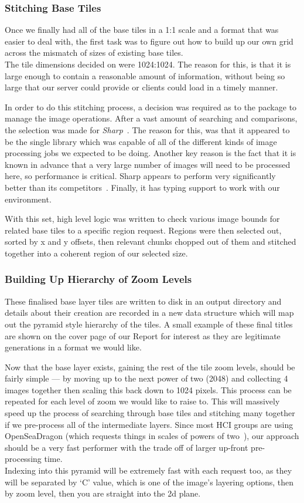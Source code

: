 \subsubsection{Stitching Base Tiles}
Once we finally had all of the base tiles in a 1:1 scale and a format that was easier to deal with, the first task
was to figure out how to build up our own grid across the mismatch of sizes of existing base tiles.\\
The tile dimensions decided on were 1024:1024. The reason for this, is that it is large enough to contain a
reasonable amount of information, without being so large that our server could provide or clients could load in
a timely manner.

In order to do this stitching process, a decision was required as to the package to manage the image operations.
After a vast amount of searching and comparisons, the selection was made for \emph{Sharp}~\cite{sharp}. The reason for
this, was that it appeared to be the single library which was capable of all of the different kinds of image
processing jobs we expected to be doing. Another key reason is the fact that it is known in advance that a very
large number of images will need to be processed here, so performance is critical. Sharp appears to perform
very significantly better than its competitors~\cite{sharpPerformance}. Finally, it has typing
support to work with our environment.

With this set, high level logic was written to check various image bounds for related base tiles to a specific
region request. Regions were then selected out, sorted by x and y offsets, then relevant chunks chopped out of
them and stitched together into a coherent region of our selected size.

\subsubsection{Building Up Hierarchy of Zoom Levels}
These finalised base layer tiles are written to disk in an output directory and details about their creation
are recorded in a new data structure which will map out the pyramid style hierarchy of the tiles.
A small example of these final titles are shown on the cover page of our Report for interest as they are
legitimate generations in a format we would like.

Now that the base layer exists, gaining the rest of the tile zoom levels, should be fairly simple --- by moving
up to the next power of two (2048) and collecting 4 images together then scaling this back down to 1024 pixels.
This process can be repeated for each level of zoom we would like to raise to. This will massively speed up
the process of searching through base tiles and stitching many together if we pre-process all of the intermediate
layers. Since most HCI groups are using OpenSeaDragon (which requests things in scales of powers
of two~\cite{openseadragon}), our approach should be a very fast performer with the trade off of larger up-front pre-processing time.\\
Indexing into this pyramid will be extremely fast with each request too, as they will be separated by `C' value, which is
one of the image's layering options, then by zoom level, then you are straight into the 2d plane.

